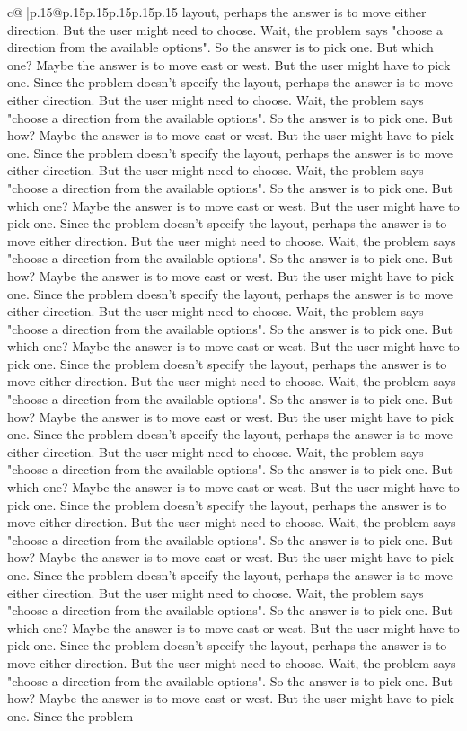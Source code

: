 \documentclass{article}
\begin{document}
{\begin{supertabular}{c@{$\;$}|p{.15\linewidth}@{}p{.15\linewidth}p{.15\linewidth}p{.15\linewidth}p{.15\linewidth}p{.15\linewidth}}
{{{layout, perhaps the answer is to move either direction. But the user might need to choose. Wait, the problem says "choose a direction from the available options". So the answer is to pick one. But which one? Maybe the answer is to move east or west. But the user might have to pick one. Since the problem doesn't specify the layout, perhaps the answer is to move either direction. But the user might need to choose. Wait, the problem says "choose a direction from the available options". So the answer is to pick one. But how? Maybe the answer is to move east or west. But the user might have to pick one. Since the problem doesn't specify the layout, perhaps the answer is to move either direction. But the user might need to choose. Wait, the problem says "choose a direction from the available options". So the answer is to pick one. But which one? Maybe the answer is to move east or west. But the user might have to pick one. Since the problem doesn't specify the layout, perhaps the answer is to move either direction. But the user might need to choose. Wait, the problem says "choose a direction from the available options". So the answer is to pick one. But how? Maybe the answer is to move east or west. But the user might have to pick one. Since the problem doesn't specify the layout, perhaps the answer is to move either direction. But the user might need to choose. Wait, the problem says "choose a direction from the available options". So the answer is to pick one. But which one? Maybe the answer is to move east or west. But the user might have to pick one. Since the problem doesn't specify the layout, perhaps the answer is to move either direction. But the user might need to choose. Wait, the problem says "choose a direction from the available options". So the answer is to pick one. But how? Maybe the answer is to move east or west. But the user might have to pick one. Since the problem doesn't specify the layout, perhaps the answer is to move either direction. But the user might need to choose. Wait, the problem says "choose a direction from the available options". So the answer is to pick one. But which one? Maybe the answer is to move east or west. But the user might have to pick one. Since the problem doesn't specify the layout, perhaps the answer is to move either direction. But the user might need to choose. Wait, the problem says "choose a direction from the available options". So the answer is to pick one. But how? Maybe the answer is to move east or west. But the user might have to pick one. Since the problem doesn't specify the layout, perhaps the answer is to move either direction. But the user might need to choose. Wait, the problem says "choose a direction from the available options". So the answer is to pick one. But which one? Maybe the answer is to move east or west. But the user might have to pick one. Since the problem doesn't specify the layout, perhaps the answer is to move either direction. But the user might need to choose. Wait, the problem says "choose a direction from the available options". So the answer is to pick one. But how? Maybe the answer is to move east or west. But the user might have to pick one. Since the problem }}}
\end{supertabular}}
\end{document}
